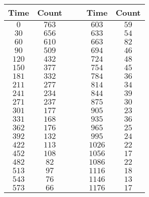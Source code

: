 \begin{tabular}{cccccc}            \toprule
Time  & Count &&& Time   & Count \\\midrule
$0$   & $763$ &&& $603$  & $59$  \\
$30$  & $656$ &&& $633$  & $54$  \\
$60$  & $610$ &&& $663$  & $82$  \\
$90$  & $509$ &&& $694$  & $46$  \\
$120$ & $432$ &&& $724$  & $48$  \\
$150$ & $377$ &&& $754$  & $45$  \\
$181$ & $332$ &&& $784$  & $36$  \\
$211$ & $277$ &&& $814$  & $34$  \\
$241$ & $234$ &&& $844$  & $39$  \\
$271$ & $237$ &&& $875$  & $30$  \\
$301$ & $177$ &&& $905$  & $23$  \\
$331$ & $168$ &&& $935$  & $36$  \\
$362$ & $176$ &&& $965$  & $25$  \\
$392$ & $132$ &&& $995$  & $24$  \\
$422$ & $113$ &&& $1026$ & $22$  \\
$452$ & $108$ &&& $1056$ & $17$  \\
$482$ & $82$  &&& $1086$ & $22$  \\
$513$ & $97$  &&& $1116$ & $18$  \\
$543$ & $76$  &&& $1146$ & $13$  \\
$573$ & $66$  &&& $1176$ & $17$  \\\bottomrule
\end{tabular}
